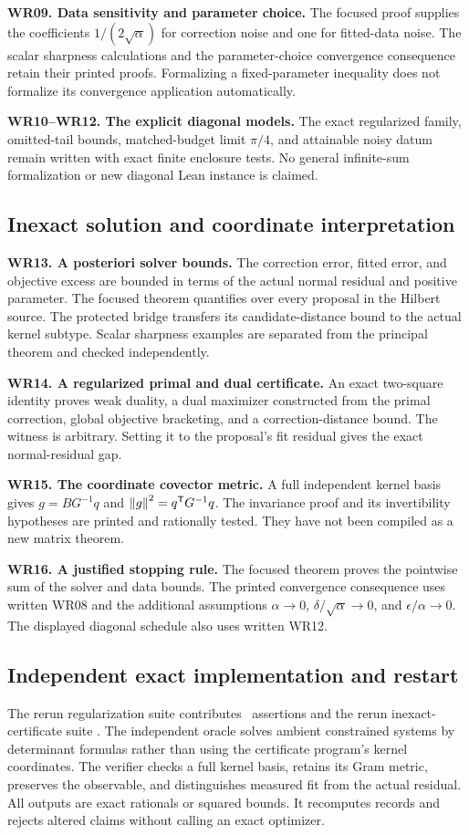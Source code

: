 \textbf{WR09. Data sensitivity and parameter choice.} The focused proof supplies the coefficients $1/(2\sqrt\alpha)$ for correction noise and one for fitted-data noise. The scalar sharpness calculations and the parameter-choice convergence consequence retain their printed proofs. Formalizing a fixed-parameter inequality does not formalize its convergence application automatically.

\textbf{WR10--WR12. The explicit diagonal models.} The exact regularized family, omitted-tail bounds, matched-budget limit $\pi/4$, and attainable noisy datum remain written with exact finite enclosure tests. No general infinite-sum formalization or new diagonal Lean instance is claimed.

\subsection{Inexact solution and coordinate interpretation}
\textbf{WR13. A posteriori solver bounds.} The correction error, fitted error, and objective excess are bounded in terms of the actual normal residual and positive parameter. The focused theorem quantifies over every proposal in the Hilbert source. The protected bridge transfers its candidate-distance bound to the actual kernel subtype. Scalar sharpness examples are separated from the principal theorem and checked independently.

\textbf{WR14. A regularized primal and dual certificate.} An exact two-square identity proves weak duality, a dual maximizer constructed from the primal correction, global objective bracketing, and a correction-distance bound. The witness is arbitrary. Setting it to the proposal's fit residual gives the exact normal-residual gap.

\textbf{WR15. The coordinate covector metric.} A full independent kernel basis gives $g=BG^{-1}q$ and $\left\lVert g\right\rVert^2=q^{\mathsf T}G^{-1}q$. The invariance proof and its invertibility hypotheses are printed and rationally tested. They have not been compiled as a new matrix theorem.

\textbf{WR16. A justified stopping rule.} The focused theorem proves the pointwise sum of the solver and data bounds. The printed convergence consequence uses written WR08 and the additional assumptions $\alpha\to0$, $\delta/\sqrt\alpha\to0$, and $\epsilon/\alpha\to0$. The displayed diagonal schedule also uses written WR12.

\subsection{Independent exact implementation and restart}
The rerun regularization suite contributes \EditionRegularizationChecks\ assertions and the rerun inexact-certificate suite \EditionInexactChecks. The independent oracle solves ambient constrained systems by determinant formulas rather than using the certificate program's kernel coordinates. The verifier checks a full kernel basis, retains its Gram metric, preserves the observable, and distinguishes measured fit from the actual residual. All outputs are exact rationals or squared bounds. It recomputes records and rejects altered claims without calling an exact optimizer.

